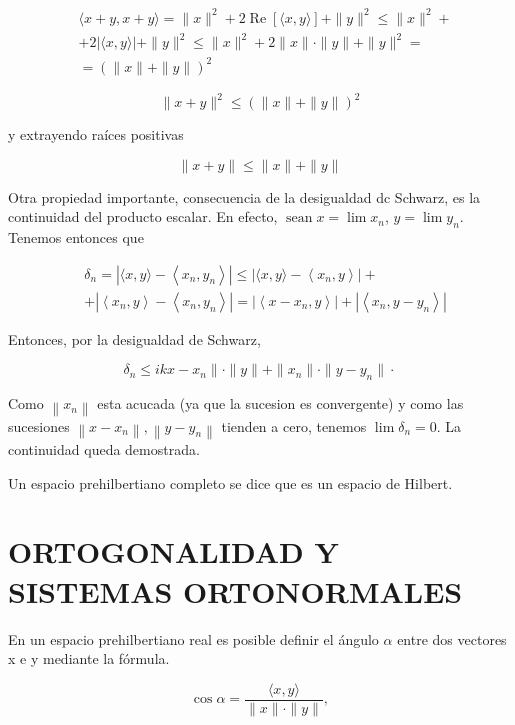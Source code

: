 \documentclass[10pt]{article}
\theoremstyle{plain}
\theoremstyle{definition}
\theoremstyle{remark}
\begin{document}
$$
\begin{aligned}
& \langle x+y, x+y\rangle=\|x\|^{2}+2 \operatorname{Re}[\langle x, y\rangle]+\|y\|^{2} \leqslant\|x\|^{2}+ \\
& +2|\langle x, y\rangle|+\|y\|^{2} \leqslant\|x\|^{2}+2\|x\| \cdot\|y\|+\|y\|^{2}= \\
& =(\|x\|+\|y\|)^{2}
\end{aligned}
$$

$$
\|x+y\|^{2} \leqslant(\|x\|+\|y\|)^{2}
$$

y extrayendo raíces positivas

$$
\|x+y\| \leqslant\|x\|+\|y\|
$$

Otra propiedad importante, consecuencia de la desigualdad dc Schwarz, es la continuidad del producto escalar. En efecto, $\operatorname{sean} x=\lim x_{n}$, $y=\lim y_{n}$. Tenemos entonces que

$$
\begin{aligned}
& \delta_{n}=\left|\langle x, y\rangle-\left\langle x_{n}, y_{n}\right\rangle\right| \leqslant\left|\langle x, y\rangle-\left\langle x_{n}, y\right\rangle\right|+ \\
& +\left|\left\langle x_{n}, y\right\rangle-\left\langle x_{n}, y_{n}\right\rangle\right|=\left|\left\langle x-x_{n}, y\right\rangle\right|+\left|\left\langle x_{n}, y-y_{n}\right\rangle\right|
\end{aligned}
$$

Entonces, por la desigualdad de Schwarz,

$$
\delta_{n} \leqslant i k x-x_{n}\|\cdot\| y\|+\| x_{n}\|\cdot\| y-y_{n} \| \cdot
$$

Como $\left\|x_{n}\right\|$ esta acucada (ya que la sucesion es convergente) y como las sucesiones $\left\|x-x_{n}\right\|,\left\|y-y_{n}\right\|$ tienden a cero, tenemos $\lim \delta_{n}=0$. La continuidad queda demostrada.

Un espacio prehilbertiano completo se dice que es un espacio de Hilbert.

\section*{ORTOGONALIDAD Y SISTEMAS ORTONORMALES}
En un espacio prehilbertiano real es posible definir el ángulo $\alpha$ entre dos vectores x e y mediante la fórmula.


\begin{equation*}
\cos \alpha=\frac{\langle x, y\rangle}{\|x\| \cdot\|y\|}, \tag{3-5}
\end{equation*}
\end{document}
